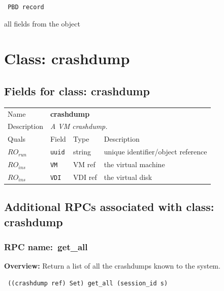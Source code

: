 \vspace{0.3cm}

{\tt 
PBD record
}


all fields from the object
\vspace{0.3cm}
\vspace{0.3cm}
\vspace{0.3cm}

\vspace{1cm}
\newpage
\section{Class: crashdump}
\subsection{Fields for class: crashdump}
\begin{longtable}{|lllp{}|}
\hline
\multicolumn{1}{|l}{Name} & \multicolumn{3}{l|}{\bf crashdump} \\
\multicolumn{1}{|l}{Description} & \multicolumn{3}{l|}{\parbox{11cm}{\em A
VM crashdump.}} \\
\hline
Quals & Field & Type & Description \\
\hline
$\mathit{RO}_\mathit{run}$ &  {\tt uuid} & string & unique identifier/object reference \\
$\mathit{RO}_\mathit{ins}$ &  {\tt VM} & VM ref & the virtual machine \\
$\mathit{RO}_\mathit{ins}$ &  {\tt VDI} & VDI ref & the virtual disk \\
\hline
\end{longtable}
\subsection{Additional RPCs associated with class: crashdump}
\subsubsection{RPC name:~get\_all}

{\bf Overview:} 
Return a list of all the crashdumps known to the system.

\begin{verbatim} ((crashdump ref) Set) get_all (session_id s)\end{verbatim}


\vspace{0.3cm}


